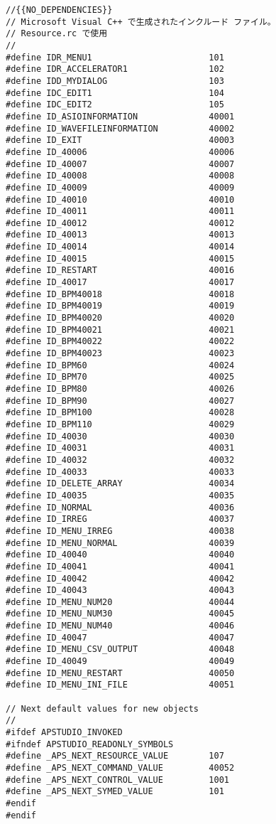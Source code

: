 \begin{lstlisting}[caption=resource.h]
//{{NO_DEPENDENCIES}}
// Microsoft Visual C++ で生成されたインクルード ファイル。
// Resource.rc で使用
//
#define IDR_MENU1                       101
#define IDR_ACCELERATOR1                102
#define IDD_MYDIALOG                    103
#define IDC_EDIT1                       104
#define IDC_EDIT2                       105
#define ID_ASIOINFORMATION              40001
#define ID_WAVEFILEINFORMATION          40002
#define ID_EXIT                         40003
#define ID_40006                        40006
#define ID_40007                        40007
#define ID_40008                        40008
#define ID_40009                        40009
#define ID_40010                        40010
#define ID_40011                        40011
#define ID_40012                        40012
#define ID_40013                        40013
#define ID_40014                        40014
#define ID_40015                        40015
#define ID_RESTART                      40016
#define ID_40017                        40017
#define ID_BPM40018                     40018
#define ID_BPM40019                     40019
#define ID_BPM40020                     40020
#define ID_BPM40021                     40021
#define ID_BPM40022                     40022
#define ID_BPM40023                     40023
#define ID_BPM60                        40024
#define ID_BPM70                        40025
#define ID_BPM80                        40026
#define ID_BPM90                        40027
#define ID_BPM100                       40028
#define ID_BPM110                       40029
#define ID_40030                        40030
#define ID_40031                        40031
#define ID_40032                        40032
#define ID_40033                        40033
#define ID_DELETE_ARRAY                 40034
#define ID_40035                        40035
#define ID_NORMAL                       40036
#define ID_IRREG                        40037
#define ID_MENU_IRREG                   40038
#define ID_MENU_NORMAL                  40039
#define ID_40040                        40040
#define ID_40041                        40041
#define ID_40042                        40042
#define ID_40043                        40043
#define ID_MENU_NUM20                   40044
#define ID_MENU_NUM30                   40045
#define ID_MENU_NUM40                   40046
#define ID_40047                        40047
#define ID_MENU_CSV_OUTPUT              40048
#define ID_40049                        40049
#define ID_MENU_RESTART                 40050
#define ID_MENU_INI_FILE                40051

// Next default values for new objects
// 
#ifdef APSTUDIO_INVOKED
#ifndef APSTUDIO_READONLY_SYMBOLS
#define _APS_NEXT_RESOURCE_VALUE        107
#define _APS_NEXT_COMMAND_VALUE         40052
#define _APS_NEXT_CONTROL_VALUE         1001
#define _APS_NEXT_SYMED_VALUE           101
#endif
#endif

\end{lstlisting}


